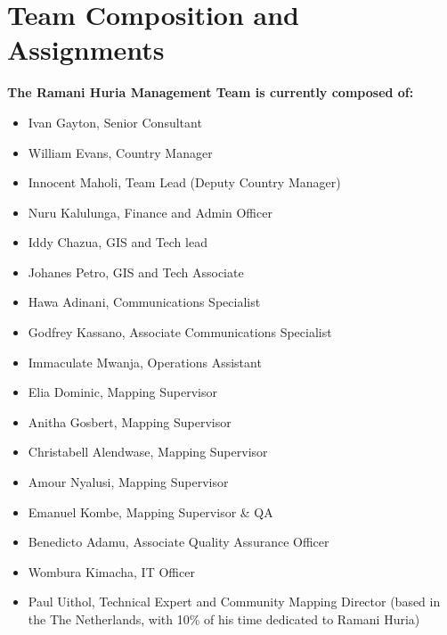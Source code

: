 \documentclass[a4paper,12pt,twoside]{article}
\begin{document}

\newpage
\section{Team Composition and Assignments}

\textbf{The Ramani Huria Management Team is currently composed of:}

\begin{itemize}
     
 \item Ivan Gayton, Senior Consultant
 \item William Evans, Country Manager
 \item Innocent Maholi, Team Lead (Deputy Country Manager)
 \item Nuru Kalulunga, Finance and Admin Officer
 \item Iddy Chazua, GIS and Tech lead
 \item Johanes Petro, GIS and Tech Associate
 \item Hawa Adinani, Communications Specialist
 \item Godfrey Kassano, Associate Communications Specialist
 \item Immaculate Mwanja, Operations Assistant
 \item Elia Dominic, Mapping Supervisor
 \item Anitha Gosbert, Mapping Supervisor
 \item Christabell Alendwase, Mapping Supervisor
 \item Amour Nyalusi, Mapping Supervisor
 \item Emanuel Kombe, Mapping Supervisor \& QA
 \item Benedicto Adamu, Associate Quality Assurance Officer
 \item Wombura Kimacha, IT Officer
 \item Paul Uithol, Technical Expert and Community Mapping Director (based in the
The Netherlands, with 10\% of his time dedicated to Ramani Huria)
\end{itemize}
\end{document}
